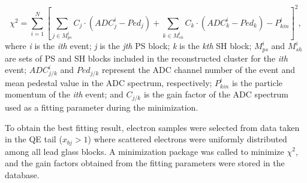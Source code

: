 \begin{equation}
  \chi^{2} = \sum_{i=1}^{N}\left[\sum_{j\in M_{ps}^{i}}C_{j}\cdot (ADC_{j}^{i}-Ped_{j})+\sum_{k\in M_{sh}^{i}}C_{k}\cdot (ADC_{k}^{i}-Ped_{k})-P_{kin}^{i}\right]^{2},
\end{equation}
where \emph{i} is the \emph{ith} event; \emph{j} is the \emph{jth} PS block; \emph{k} is the \emph{kth} SH block; $M_{ps}^{i}$ and $M_{sh}^{i}$ are sets of PS and SH blocks included in the reconstructed cluster for the \emph{ith} event; $ADC_{j/k}^{i}$ and $Ped_{j/k}$ represent the ADC channel number of the event and mean pedestal value in the ADC spectrum, respectively; $P_{kin}^{i}$ is the particle momentum of the \emph{ith} event; and $C_{j/k}$ is the gain factor of the ADC spectrum used as a fitting parameter during the minimization.

 To obtain the best fitting result, electron samples were selected from data taken in the QE tail ($x_{bj}>1$) where scattered electrons were uniformly distributed among all lead glass blocks. A minimization package \cite{shower_luhj} was called to minimize $\chi^{2}$, and the gain factors obtained from the fitting parameters were stored in the database.


